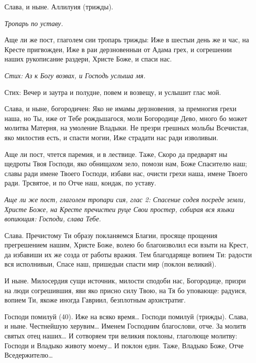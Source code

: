 Слава, и ныне. Аллилуия (трижды).


\itshape Тропарь по уставу.\normalfont{} 

Аще ли же пост, глаголем сии тропарь трижды: Иже в шестыи день же и час, на Кресте пригвождеи, Иже в раи дерзновенныи от Адама грех, и согрешении наших рукописание раздери, Христе Боже, и спаси нас.

\itshape Стих: \normalfont{}Аз к Богу возвах, и Господь услыша мя.

Стих: Вечер и заутра и полудне, повем и возвещу, и услышит глас мой.

Слава, и ныне, богородичен: Яко не имамы дерзновения, за премногия грехи наша, но Ты, иже от Тебе рождьшагося, моли Богородице Дево, много бо может молитва Матерня, на умоление Владыки. Не презри грешных мольбы Всечистая, яко милостив есть, и спасти могии, Иже страдати нас ради изволивыи. 

Аще ли пост, чтется паремия, и в лествице. Таже, Скоро да предварят ны щедроты Твоя Господи, яко обнищахом зело, помози нам, Боже Спасителю наш; славы ради имене Твоего Господи, избави нас, очисти грехи наша, имене Твоего ради. Трсвятое, и по Отче наш, кондак, по уставу. 

\itshape Аще ли же пост, глаголем тропари сия, глас 2: \normalfont{}Спасение содея посреде земли, Христе Боже, на Кресте пречистеи руце Свои простер, собирая вся языки вопиющия: Господи, слава Тебе. 

Слава. Пречистому Ти образу покланяемся Благии, просяще прощения прегрешением нашим, Христе Боже, волею бо благоизволил еси взыти на Крест, да избавиши их же созда от работы вражия. Тем благодаряще вопием Ти: радости вся исполнивыи, Спасе наш, пришедыи спасти мир (поклон великий). 

И ныне. Милосердия сущи источник, милости сподоби нас, Богородице, призри на люди согрешившия, яви яко присно силу Твою, на Тя бо уповающе: радуися, вопием Ти, якоже иногда Гавриил, безплотным архистратиг. 

Господи помилуй (40). Иже на всяко время… Господи помилуй (трижды). Слава, и ныне. Честнейшую херувим… Именем Господним благослови, отче. За молитв святых отец наших… И сотворяем три великия поклоны, глаголюще молитву: Господи и Владыко животу моему… И поклон един. Таже, Владыко Боже, Отче Вседержителю… 

